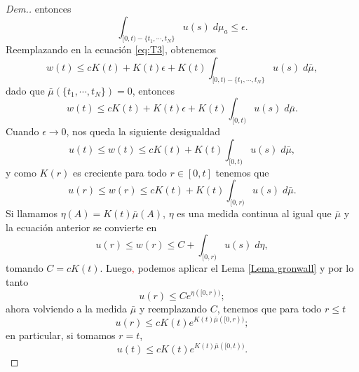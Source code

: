 \begin{proof}[Dem.]
entonces
\begin{equation*}
	\int_{[0,t)-\{t_1,\cdots ,t_N\}}u(s)\;d\mu_a\leq \epsilon.
\end{equation*}
Reemplazando en la ecuación \eqref{eq:T3}, obtenemos
\begin{equation*}
	w(t)\leq cK(t) +K(t)\epsilon+K(t)\int_{[0,t)-\{t_1,\cdots ,t_N\}}u(s)\;d\bar{\mu}, 
\end{equation*}
dado que $\bar{\mu}\left( \{t_1,\cdots,t_N\}\right)=0$, entonces
\begin{equation*}
	w(t)\leq cK(t)+ K(t)\epsilon+K(t)\int_{[0,t)}u(s)\;d\bar{\mu}.
\end{equation*}
Cuando $\epsilon\to 0$, nos queda la siguiente desigualdad
\begin{equation*}
	u(t)\leq w(t)\leq cK(t)+K(t)\int_{[0,t)}u(s)\; d\bar{\mu},
\end{equation*}
y como $K(r)$ es creciente para todo $r\in[0,t]$ tenemos que
\begin{equation*}
	u(r)\leq w(r)\leq cK(t)+K(t)\int_{[0,r)}u(s)\;d\bar{\mu}. 
\end{equation*}
Si llamamos $\eta(A)=K(t)\bar{\mu}(A)$,   $\eta$ es una medida continua al igual que $\bar{\mu}$ y la ecuación anterior se convierte en
\begin{equation*}\label{eq:T4}
	u(r)\leq w(r)\leq C+\int_{[0,r)}u(s)\;d\eta,
\end{equation*}
tomando $C=cK(t)$. Luego\textcolor{red}{,} podemos aplicar el Lema \ref{Lema gronwall} y por lo tanto 
$$u(r)\leq Ce^{\eta([0,r))};$$
ahora volviendo a la medida $\bar{\mu}$ y reemplazando $C$,  tenemos
que para todo $r\leq t$
\begin{equation*}
u(r)\leq cK(t) e^{K(t)\bar{\mu}([0,r))};
\end{equation*}
en particular, si tomamos $r=t$,
\begin{equation*}
u(t)\leq cK(t) e^{K(t)\bar{\mu}([0,t))}.
\end{equation*}
\end{proof}






 	
 	
